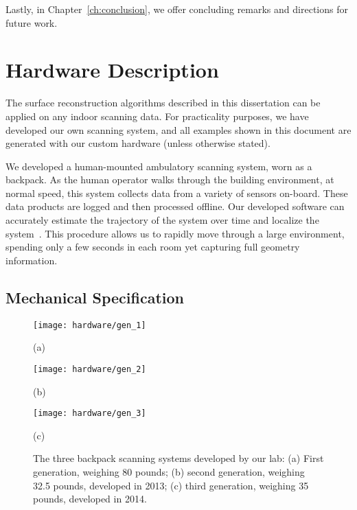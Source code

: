 \documentclass[12pt,onecolumn,oneside]{book}
\begin{document}
Lastly, in Chapter~\ref{ch:conclusion}, we offer concluding remarks and directions for future work.


\chapter{Hardware Description}
\label{ch:hardware}

The surface reconstruction algorithms described in this dissertation can be applied on any indoor scanning data.  For practicality purposes, we have developed our own scanning system, and all examples shown in this document are generated with our custom hardware (unless otherwise stated).

We developed a human-mounted ambulatory scanning system, worn as a backpack.  As the human operator walks through the building environment, at normal speed, this system collects data from a variety of sensors on-board.  These data products are logged and then processed offline.  Our developed software can accurately estimate the trajectory of the system over time and localize the system~\cite{NickJournal}.  This procedure allows us to rapidly move through a large environment, spending only a few seconds in each room yet capturing full geometry information.

\section{Mechanical Specification}
\label{sec:mechanical}

\begin{figure}

	\centering
	\begin{minipage}[c]{0.32\linewidth}
		\centerline{\texttt{[image: hardware/gen\_1]}}
		\centerline{(a)}\medskip
	\end{minipage}
	\hfill
	\begin{minipage}[c]{0.32\linewidth}
		\centerline{\texttt{[image: hardware/gen\_2]}}
		\centerline{(b)}\medskip
	\end{minipage}
	\hfill
	\begin{minipage}[c]{0.32\linewidth}
		\centerline{\texttt{[image: hardware/gen\_3]}}
		\centerline{(c)}\medskip
	\end{minipage}	

	\caption[The three backpack scanning systems developed by our lab.]{The three backpack scanning systems developed by our lab:  (a) First generation, weighing 80 pounds; (b) second generation, weighing 32.5 pounds, developed in 2013; (c) third generation, weighing 35 pounds, developed in 2014.}
	\label{fig:all_backpacks}

\end{figure}
\end{document}
